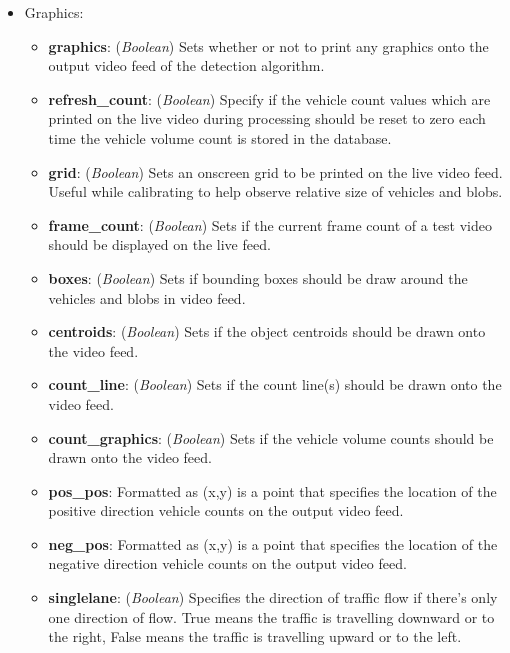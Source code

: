 \begin{itemize}
\item Graphics:
    \begin{itemize}
        \item\textbf{graphics}: (\emph{Boolean}) Sets whether or not to print any graphics onto the output video feed of the detection algorithm.
        \item \textbf{refresh\_count}: (\emph{Boolean}) Specify if the vehicle count values which are printed on the live video during processing should be reset to zero each time the vehicle volume count is stored in the database.
        \item \textbf{grid}: (\emph{Boolean}) Sets an onscreen grid to be printed on the live video feed. Useful while calibrating to help observe relative size of vehicles and blobs.
        \item \textbf{frame\_count}: (\emph{Boolean}) Sets if the current frame count of a test video should be displayed on the live feed. 
        \item \textbf{boxes}: (\emph{Boolean}) Sets if bounding boxes should be draw around the vehicles and blobs in video feed.
        \item\textbf{centroids}: (\emph{Boolean}) Sets if the object centroids should be drawn onto the video feed.
        \item\textbf{count\_line}: (\emph{Boolean}) Sets if the count line(s) should be drawn onto the video feed.
        \item\textbf{count\_graphics}: (\emph{Boolean}) Sets if the vehicle volume counts should be drawn onto the video feed.
        \item\textbf{pos\_pos}: Formatted as (x,y) is a point that specifies the location of the positive direction vehicle counts on the output video feed.
        \item\textbf{neg\_pos}: Formatted as (x,y) is a point that specifies the location of the negative direction vehicle counts on the output video feed.
        \item\textbf{singlelane}: (\emph{Boolean}) Specifies the direction of traffic flow if there's only one direction of flow. True means the traffic is travelling downward or to the right, False means the traffic is travelling upward or to the left.
    \end{itemize}
\end{itemize}